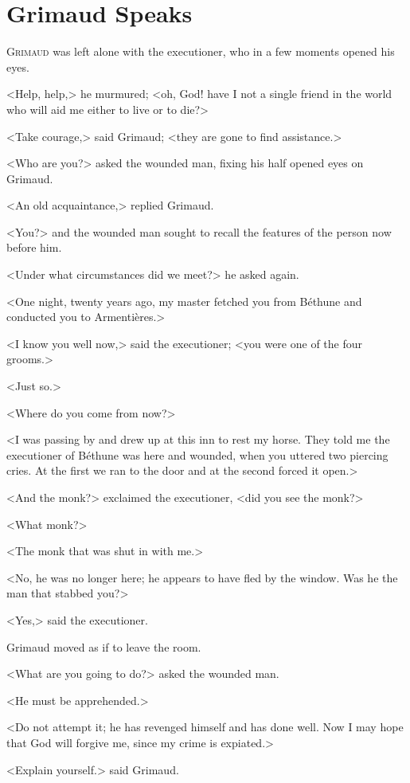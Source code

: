 \chapter{Grimaud Speaks}

 \lettrine{G}{rimaud} was left alone with the executioner, who in a few moments opened his eyes.

\zz
<Help, help,> he murmured; <oh, God! have I not a single friend in the world who will aid me either to live or to die?>

\zz
<Take courage,> said Grimaud; <they are gone to find assistance.>

<Who are you?> asked the wounded man, fixing his half opened eyes on Grimaud.

<An old acquaintance,> replied Grimaud.

<You?> and the wounded man sought to recall the features of the person now before him.

<Under what circumstances did we meet?> he asked again.

<One night, twenty years ago, my master fetched you from Béthune and conducted you to Armentières.>

<I know you well now,> said the executioner; <you were one of the four grooms.>

<Just so.>

<Where do you come from now?>

<I was passing by and drew up at this inn to rest my horse. They told me the executioner of Béthune was here and wounded, when you uttered two piercing cries. At the first we ran to the door and at the second forced it open.>

<And the monk?> exclaimed the executioner, <did you see the monk?>

<What monk?>

<The monk that was shut in with me.>

<No, he was no longer here; he appears to have fled by the window. Was he the man that stabbed you?>

<Yes,> said the executioner.

Grimaud moved as if to leave the room.

<What are you going to do?> asked the wounded man.

<He must be apprehended.>

<Do not attempt it; he has revenged himself and has done well. Now I may hope that God will forgive me, since my crime is expiated.>

<Explain yourself.> said Grimaud.

